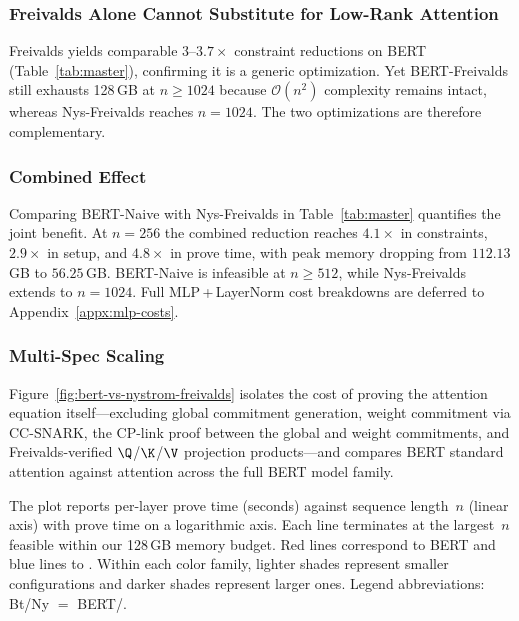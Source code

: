 \documentclass[runningheads]{llncs}
\begin{document}
\subsubsection{Freivalds Alone Cannot Substitute for Low-Rank Attention}
\label{subsec:freivalds-not-enough}
Freivalds yields comparable $3$--$3.7{\times}$ constraint reductions on BERT (Table~\ref{tab:master}), confirming it is a generic optimization. Yet BERT-Freivalds still exhausts 128\,GB at $n{\geq}1024$ because $\mathcal{O}(n^2)$ complexity remains intact, whereas Nys-Freivalds reaches $n{=}1024$. The two optimizations are therefore complementary.

\subsubsection{Combined Effect}
\label{subsec:combined-effect}
Comparing BERT-Naive with Nys-Freivalds in Table~\ref{tab:master} quantifies the joint benefit. At $n{=}256$ the combined reduction reaches $4.1{\times}$ in constraints, $2.9{\times}$ in setup, and $4.8{\times}$ in prove time, with peak memory dropping from $112.13$\,GB to $56.25$\,GB. BERT-Naive is infeasible at $n{\geq}512$, while Nys-Freivalds extends to $n{=}1024$. Full MLP\,+\,LayerNorm cost breakdowns are deferred to Appendix~\ref{appx:mlp-costs}.



\subsubsection{Multi-Spec Scaling}
\label{subsec:multi-spec}

Figure~\ref{fig:bert-vs-nystrom-freivalds} isolates the cost of proving the attention equation itself---excluding global commitment generation, weight commitment via CC-SNARK, the CP-link proof between the global and weight commitments, and Freivalds-verified $\Q$/$\K$/$\V$ projection products---and compares BERT standard attention against \nystrom attention across the full BERT model family.

The plot reports per-layer prove time (seconds) against sequence length~$n$ (linear axis) with prove time on a logarithmic axis. Each line terminates at the largest~$n$ feasible within our 128\,GB memory budget. Red lines correspond to BERT and blue lines to \nystrom. Within each color family, lighter shades represent smaller configurations and darker shades represent larger ones. Legend abbreviations: Bt/Ny $=$ BERT/\nystrom.
\end{document}
